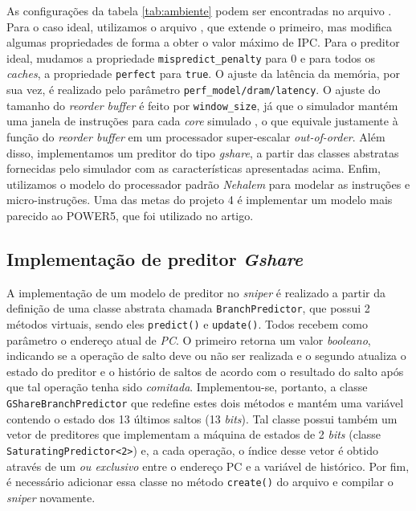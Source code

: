\documentclass[12pt]{article}
\begin{document}
As configurações da tabela \ref{tab:ambiente} podem ser encontradas no arquivo
. Para o caso ideal, utilizamos o arquivo
, que extende o primeiro, mas modifica algumas
propriedades de forma a obter o valor máximo de IPC. Para o preditor ideal,
mudamos a propriedade \texttt{mispredict\_penalty} para 0 e para todos os
\textit{caches}, a propriedade \texttt{perfect} para \texttt{true}. O ajuste da
latência da memória, por sua vez, é realizado pelo parâmetro
\texttt{perf\_model/dram/latency}. O ajuste do tamanho do \textit{reorder
buffer} é feito por \texttt{window\_size}, já que o simulador
mantém uma janela de instruções para cada \textit{core} simulado
\cite{interval}, o que equivale justamente à função do \textit{reorder buffer}
em um processador super-escalar \textit{out-of-order}. Além disso, implementamos um
preditor do tipo \textit{gshare}, a partir das classes abstratas fornecidas
pelo simulador com as características apresentadas acima. Enfim, utilizamos o
modelo do processador padrão \textit{Nehalem} para modelar as instruções e
micro-instruções. Uma das metas do projeto 4 é implementar um modelo mais
parecido ao POWER5, que foi utilizado no artigo.

\subsection{Implementação de preditor \textit{Gshare}}

A implementação de um modelo de preditor no \textit{sniper} é realizado a partir
da definição de uma classe abstrata chamada \texttt{BranchPredictor}, que possui
2 métodos virtuais, sendo eles \texttt{predict()} e \texttt{update()}.
Todos recebem como parâmetro o endereço atual de \textit{PC}. O primeiro retorna
um valor \textit{booleano}, indicando se a operação de salto deve ou não ser
realizada e o segundo atualiza o estado do preditor e o histório de saltos de
acordo com o resultado do salto após que tal operação tenha sido
\textit{comitada}. Implementou-se, portanto, a classe
\texttt{GShareBranchPredictor} que redefine estes dois métodos e mantém uma
variável contendo o estado dos 13 últimos saltos (13 \textit{bits}). Tal classe
possui também um vetor de preditores que implementam a máquina de estados de 2
\textit{bits} (classe \texttt{SaturatingPredictor<2>}) e, a cada operação, o
índice desse vetor é obtido através de um \textit{ou exclusivo} entre o endereço
PC e a variável de histórico. Por fim, é necessário adicionar essa classe no
método \texttt{create()} do arquivo  e compilar o
\textit{sniper} novamente.
\end{document}
